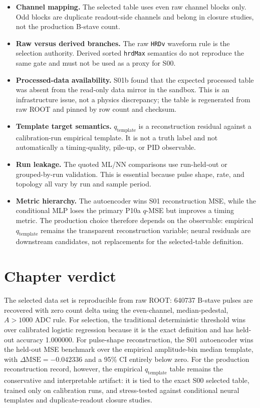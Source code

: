 \begin{itemize}
  \item \textbf{Channel mapping.}  The selected table uses even raw channel
  blocks only.  Odd blocks are duplicate readout-side channels and belong in
  closure studies, not the production B-stave count.

  \item \textbf{Raw versus derived branches.}  The raw \texttt{HRDv} waveform
  rule is the selection authority.  Derived sorted \texttt{hrdMax} semantics do
  not reproduce the same gate and must not be used as a proxy for S00.

  \item \textbf{Processed-data availability.}  S01b found that the expected
  processed table was absent from the read-only data mirror in the sandbox.
  This is an infrastructure issue, not a physics discrepancy; the table is
  regenerated from raw ROOT and pinned by row count and checksum.

  \item \textbf{Template target semantics.}  \(q_{\mathrm{template}}\) is a
  reconstruction residual against a calibration-run empirical template.  It is
  not a truth label and not automatically a timing-quality, pile-up, or PID
  observable.

  \item \textbf{Run leakage.}  The quoted ML/NN comparisons use run-held-out or
  grouped-by-run validation.  This is essential because pulse shape, rate, and
  topology all vary by run and sample period.

  \item \textbf{Metric hierarchy.}  The autoencoder wins S01 reconstruction
  MSE, while the conditional MLP loses the primary P10a \(q\)-MSE but improves a
  timing metric.  The production choice therefore depends on the observable:
  empirical \(q_{\mathrm{template}}\) remains the transparent reconstruction
  variable; neural residuals are downstream candidates, not replacements for
  the selected-table definition.
\end{itemize}

\section{Chapter verdict}
\label{sec:data-verdict}

The selected data set is reproducible from raw ROOT: \num{640737} B-stave
pulses are recovered with zero count delta using the even-channel,
median-pedestal, \(A>1000\) ADC rule.  For selection, the traditional
deterministic threshold wins over calibrated logistic regression because it is
the exact definition and has held-out accuracy 1.000000.  For pulse-shape
reconstruction, the S01 autoencoder wins the held-out MSE benchmark over the
empirical amplitude-bin median template, with \(\Delta\mathrm{MSE}=-0.042336\)
and a 95\% CI entirely below zero.  For the production reconstruction record,
however, the empirical \(q_{\mathrm{template}}\) table remains the conservative
and interpretable artifact: it is tied to the exact S00 selected table, trained
only on calibration runs, and stress-tested against conditional neural
templates and duplicate-readout closure studies.
